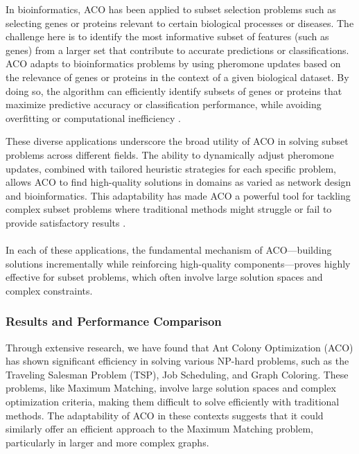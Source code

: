 In bioinformatics, ACO has been applied to subset selection problems such as selecting genes or proteins relevant to certain biological processes or diseases. The challenge here is to identify the most informative subset of features (such as genes) from a larger set that contribute to accurate predictions or classifications. ACO adapts to bioinformatics problems by using pheromone updates based on the relevance of genes or proteins in the context of a given biological dataset. By doing so, the algorithm can efficiently identify subsets of genes or proteins that maximize predictive accuracy or classification performance, while avoiding overfitting or computational inefficiency \cite{Stutzle2011}.

These diverse applications underscore the broad utility of ACO in solving subset problems across different fields. The ability to dynamically adjust pheromone updates, combined with tailored heuristic strategies for each specific problem, allows ACO to find high-quality solutions in domains as varied as network design and bioinformatics. This adaptability has made ACO a powerful tool for tackling complex subset problems where traditional methods might struggle or fail to provide satisfactory results \cite{Leguizamon1999}.



\paragraph{}In each of these applications, the fundamental mechanism of ACO—building solutions incrementally while reinforcing high-quality components—proves highly effective for subset problems, which often involve large solution spaces and complex constraints.

\subsubsection*{Results and Performance Comparison}
Through extensive research, we have found that Ant Colony Optimization (ACO) has shown significant efficiency in solving various NP-hard problems, such as the Traveling Salesman Problem (TSP), Job Scheduling, and Graph Coloring. These problems, like Maximum Matching, involve large solution spaces and complex optimization criteria, making them difficult to solve efficiently with traditional methods. The adaptability of ACO in these contexts suggests that it could similarly offer an efficient approach to the Maximum Matching problem, particularly in larger and more complex graphs.

